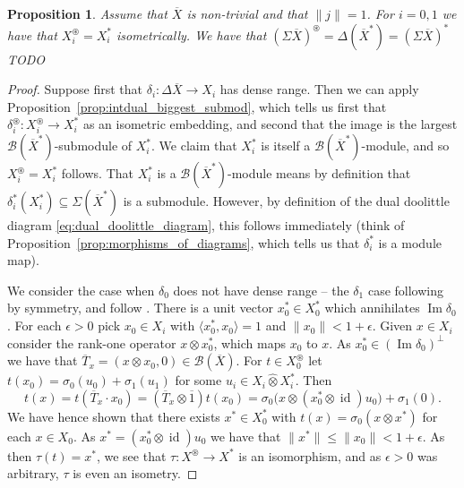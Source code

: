 \documentclass[a4paper,11pt]{article}
\theoremstyle{plain}
\newtheorem{proposition}{Proposition}[section]
\theoremstyle{remark}
\newcommand{\mc}[1]{\mathcal{#1}}
\newcommand{\ip}[2]{{\langle {#1} , {#2} \rangle}}
\newcommand{\id}{\operatorname{id}}
\newcommand{\proten}{\widehat\otimes}
\newcommand{\im}{{\operatorname{Im}}}
\newcommand{\intdual}{\circledast}
\begin{document}
\begin{proposition}
Assume that $\overline X$ is non-trivial and that $\|j\|=1$.  For $i=0,1$ we have that $X_i^\intdual = X_i^*$ isometrically.  We have that $(\Sigma\overline X)^\intdual = \Delta(\overline X^*) = (\Sigma\overline X)^*$ TODO
\end{proposition}
\begin{proof}
Suppose first that $\delta_i \colon \Delta\overline X \to X_i$ has dense range.  Then we can apply Proposition~\ref{prop:intdual_biggest_submod}, which tells us first that $\delta_i^\intdual \colon X_i^\intdual \to X_i^*$ as an isometric embedding, and second that the image is the largest $\mc B(\overline X^*)$-submodule of $X_i^*$.  We claim that $X_i^*$ is itself a $\mc B(\overline X^*)$-module, and so $X_i^\intdual = X_i^*$ follows.  That $X_i^*$ is a $\mc B(\overline X^*)$-module means by definition that $\delta_i^*(X_i^*) \subseteq \Sigma(\overline X^*)$ is a submodule.  However, by definition of the dual doolittle diagram \eqref{eq:dual_doolittle_diagram}, this follows immediately (think of Proposition~\ref{prop:morphisms_of_diagrams}, which tells us that $\delta_i^*$ is a module map).

We consider the case when $\delta_0$ does not have dense range -- the $\delta_1$ case following by symmetry, and follow \cite[Proposition~IV.5.11]{KP_InterpolationFunctorsDuality}.  There is a unit vector $x_0^*\in X_0^*$ which annihilates $\im\delta_0$.  For each $\epsilon>0$ pick $x_0\in X_i$ with $\ip{x_0^*}{x_0}=1$ and $\|x_0\|<1+\epsilon$.  Given $x\in X_i$ consider the rank-one operator $x\otimes x_0^*$, which maps $x_0$ to $x$.  As $x_0^*\in (\im\delta_0)^\perp$ we have that $\overline T_x = (x\otimes x_0, 0) \in\mc B(\overline X)$.  For $t\in X_0^\intdual$ let $t(x_0) = \sigma_0(u_0) + \sigma_1(u_1)$ for some $u_i\in X_i\proten X_i^*$.  Then
\[ t(x) = t(\overline T_x \cdot x_0) = (\overline T_x\otimes\overline 1)t(x_0)
= \sigma_0\big( x \otimes (x_0^*\otimes\id)u_0 \big) + \sigma_1(0). \]
We have hence shown that there exists $x^*\in X_0^*$ with $t(x) = \sigma_0(x\otimes x^*)$ for each $x\in X_0$.  As $x^* = (x_0^*\otimes\id)u_0$ we have that $\|x^*\| \leq \|x_0\| < 1+\epsilon$.  As then $\tau(t) = x^*$, we see that $\tau \colon X^\intdual \to X^*$ is an isomorphism, and as $\epsilon>0$ was arbitrary, $\tau$ is even an isometry.


\end{proof}
\end{document}

